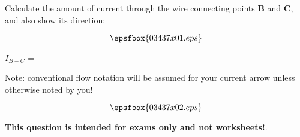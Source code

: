 

Calculate the amount of current through the wire connecting points {\bf B} and {\bf C}, and also show its direction:

$$\epsfbox{03437x01.eps}$$

$I_{B-C}$ = 

\vskip 10pt

Note: conventional flow notation will be assumed for your current arrow unless otherwise noted by you!







$$\epsfbox{03437x02.eps}$$







{\bf This question is intended for exams only and not worksheets!}.



